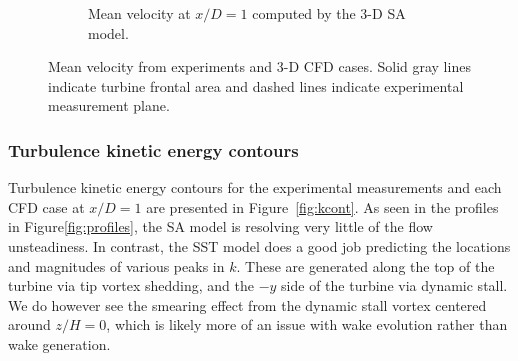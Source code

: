 \documentclass[aip,graphicx]{revtex4-1}
\begin{document}
\begin{figure}
\begin{subfigure}[b]{\textwidth}
        \caption{Mean velocity at $x/D=1$ computed by the 3-D SA model.}
        
        \label{fig:meancontquiv-SA}
    \end{subfigure}

    \caption{Mean velocity from experiments and 3-D CFD cases. Solid gray lines
        indicate turbine frontal area and dashed lines indicate experimental
        measurement plane.}
    
    \label{fig:mean-velocity}
\end{figure}


\subsubsection{Turbulence kinetic energy contours}

Turbulence kinetic energy contours for the experimental measurements and each
CFD case at $x/D=1$ are presented in Figure~\ref{fig:kcont}. As seen in the
profiles in Figure\ref{fig:profiles}, the SA model is resolving very little of
the flow unsteadiness. In contrast, the SST model does a good job predicting the
locations and magnitudes of various peaks in $k$. These are generated along the
top of the turbine via tip vortex shedding, and the $-y$ side of the turbine via
dynamic stall. We do however see the smearing effect from the dynamic stall
vortex centered around $z/H=0$, which is likely more of an issue with wake
evolution rather than wake generation.
\end{document}
